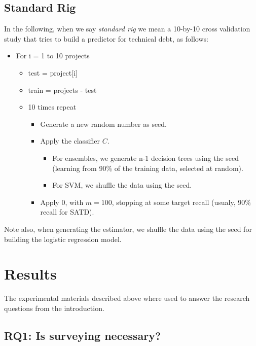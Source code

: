 \documentclass[10pt,conference]{IEEEtran}
\newcommand{\bi}{\begin{itemize}}
\newcommand{\ei}{\end{itemize}}
\begin{document}


\subsection{Standard Rig}

In the following, when we say {\em standard rig} we mean a 10-by-10 cross validation study that tries to build a predictor
for technical debt, as follows:
\bi
\item For i = 1 to 10 projects
\bi
\item test = project[i]
\item train = projects - test
\item 10 times repeat
\bi
\item Generate a new random number as seed. 
\item Apply the classifier $C$.
\bi
\item
For ensembles, we generate n-1 decision trees using the seed (learning from 90\% of the training data, selected at random).
\item For SVM, we shuffle the data using the seed. 
\ei
\item Apply {\IT}0, with $m=100$, stopping at some target recall
(usualy, 90\% recall for SATD). 
\ei
\ei
\ei
Note also, 
 when generating the estimator, we shuffle the data using the seed for building the logistic regression model.




%
\section{Results}
\label{section results}

The experimental materials described above where used to answer the 
  research questions from the introduction.

\subsection{RQ1: Is surveying necessary?}
 
\end{document}
